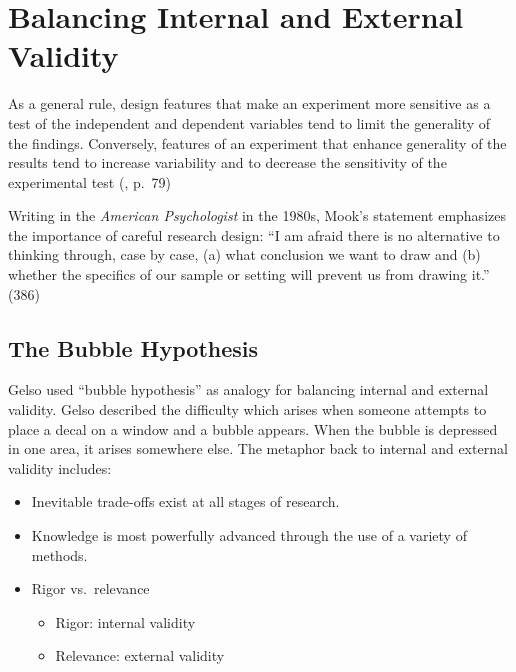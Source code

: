 \documentclass[
  english,
]{book}
\providecommand{\tightlist}{%
  \setlength{\itemsep}{0pt}\setlength{\parskip}{0pt}}
\begin{document}
\hypertarget{balancing-internal-and-external-validity}{%
\section{Balancing Internal and External Validity}\label{balancing-internal-and-external-validity}}

As a general rule, design features that make an experiment more sensitive as a test of the independent and dependent variables tend to limit the generality of the findings. Conversely, features of an experiment that enhance generality of the results tend to increase variability and to decrease the sensitivity of the experimental test (\citeyearpar{kazdin_research_2017}, p.~79)

Writing in the \emph{American Psychologist} in the 1980s, Mook's \citeyearpar{mook_defense_1983} statement emphasizes the importance of careful research design: ``I am afraid there is no alternative to thinking through, case by case, (a) what conclusion we want to draw and (b) whether the specifics of our sample or setting will prevent us from drawing it.'' (386)

\hypertarget{the-bubble-hypothesis}{%
\subsection{The Bubble Hypothesis}\label{the-bubble-hypothesis}}

Gelso \citeyearpar{gelso_research_1979} used ``bubble hypothesis'' as analogy for balancing internal and external validity. Gelso described the difficulty which arises when someone attempts to place a decal on a window and a bubble appears. When the bubble is depressed in one area, it arises somewhere else. The metaphor back to internal and external validity includes:

\begin{itemize}
\tightlist
\item
  Inevitable trade-offs exist at all stages of research.
\item
  Knowledge is most powerfully advanced through the use of a variety of methods.
\item
  Rigor vs.~relevance

  \begin{itemize}
  \tightlist
  \item
    Rigor: internal validity
  \item
    Relevance: external validity
  \end{itemize}
\end{itemize}
\end{document}
